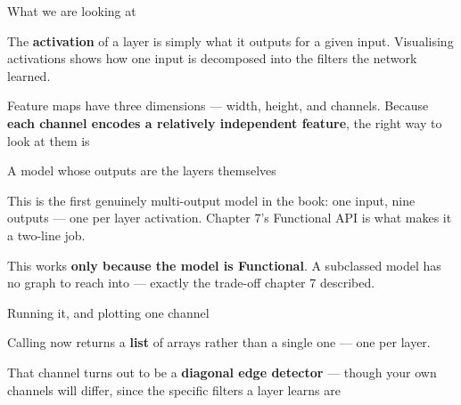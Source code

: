 \documentclass[aspectratio=169,11pt,t]{beamer}
\begin{document}
\begin{frame}[shrink=25]{What we are looking at}
{\fontsize{9.4}{12.6}\selectfont\color{fg2}The \textbf{activation} of a layer is simply what it outputs for a given input. Visualising activations shows how one input is decomposed into the filters the network learned.\par}\vskip 4pt
\begin{iband}[signal]
Feature maps have three dimensions --- width, height, and channels. Because \textbf{each channel encodes a relatively independent feature}, the right way to look at them is 
\end{iband}
\end{frame}

\begin{frame}[shrink=25]{A model whose outputs are the layers themselves}
{\fontsize{9.4}{12.6}\selectfont\color{fg2}This is the first genuinely multi-output model in the book: one input, nine outputs --- one per layer activation. Chapter 7's Functional API is what makes it a two-line job.\par}\vskip 4pt
{\fontsize{9.4}{12.6}\selectfont\color{fg2}This works \textbf{only because the model is Functional}. A subclassed model has no graph to reach into --- exactly the trade-off chapter 7 described.\par}\vskip 4pt
\end{frame}

\begin{frame}[shrink=25]{Running it, and plotting one channel}
{\fontsize{9.4}{12.6}\selectfont\color{fg2}Calling  now returns a \textbf{list} of arrays rather than a single one --- one per layer.\par}\vskip 4pt
\begin{iband}[signal]
That channel turns out to be a \textbf{diagonal edge detector} --- though your own channels will differ, since the specific filters a layer learns are 
\end{iband}
\end{frame}
\end{document}
